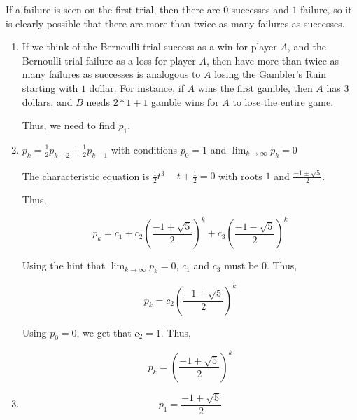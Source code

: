 If a failure is seen on the first trial, then there are $0$ successes and
$1$ failure, so it is clearly possible that there are more than twice as many
failures as successes.

\begin{enumerate}[label=(\alph*)]

\item If we think of the Bernoulli trial success as a win for player $A$, and
the Bernoulli trial failure as a loss for player $A$, then have more than twice
as many failures as successes is analogous to $A$ losing the Gambler's Ruin
starting with $1$ dollar. For instance, if $A$ wins the first gamble, then $A$ has $3$ dollars, and $B$
needs $2*1 + 1$ gamble wins for $A$ to lose the entire game.

Thus, we need to find $p_{1}$.

\item $p_{k} = \frac{1}{2}p_{k+2} + \frac{1}{2}p_{k-1}$ with conditions $p_{0} =
1$ and
$\lim_{k \rightarrow \infty} p_{k} = 0$

The characteristic equation is $\frac{1}{2}t^{3} - t + \frac{1}{2} = 0$ with
roots $1$ and $\frac{-1 \pm \sqrt{5}}{2}$.

Thus,

$$p_{k} = c_{1} + c_{2}(\frac{-1+\sqrt{5}}{2})^{k} + c_{3}(\frac{-1-\sqrt{5}}
{2})^{k}$$

Using the hint that $\lim_{k \rightarrow \infty} p_{k} = 0$, $c_{1}$ and $c_{3}$
must be $0$. Thus, 

$$p_{k} = c_{2}(\frac{-1+\sqrt{5}}{2})^{k}$$

Using $p_{0} = 0$, we get that $c_{2} = 1$. Thus,

$$p_{k} = (\frac{-1+\sqrt{5}}{2})^{k}$$


\item
$$p_{1} = \frac{-1+\sqrt{5}}{2}$$

\end{enumerate}